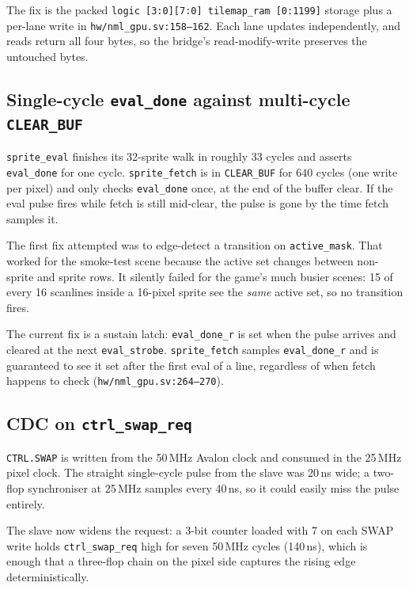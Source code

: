 \documentclass[11pt,letterpaper]{article}
\begin{document}
The fix is the packed \texttt{logic [3:0][7:0] tilemap\_ram [0:1199]}
storage plus a per-lane write in \texttt{hw/nml\_gpu.sv:158--162}. Each lane
updates independently, and reads return all four bytes, so the bridge's
read-modify-write preserves the untouched bytes.

\subsection{Single-cycle \texttt{eval\_done} against multi-cycle \texttt{CLEAR\_BUF}}

\texttt{sprite\_eval} finishes its 32-sprite walk in roughly 33 cycles and
asserts \texttt{eval\_done} for one cycle. \texttt{sprite\_fetch} is in
\texttt{CLEAR\_BUF} for 640 cycles (one write per pixel) and only checks
\texttt{eval\_done} once, at the end of the buffer clear. If the eval pulse
fires while fetch is still mid-clear, the pulse is gone by the time fetch
samples it.

The first fix attempted was to edge-detect a transition on
\texttt{active\_mask}. That worked for the smoke-test scene because the
active set changes between non-sprite and sprite rows. It silently failed
for the game's much busier scenes: 15 of every 16 scanlines inside a
16-pixel sprite see the \emph{same} active set, so no transition fires.

The current fix is a sustain latch: \texttt{eval\_done\_r} is set when the
pulse arrives and cleared at the next \texttt{eval\_strobe}.
\texttt{sprite\_fetch} samples \texttt{eval\_done\_r} and is guaranteed to
see it set after the first eval of a line, regardless of when fetch happens
to check (\texttt{hw/nml\_gpu.sv:264--270}).

\subsection{CDC on \texttt{ctrl\_swap\_req}}

\texttt{CTRL.SWAP} is written from the 50\,MHz Avalon clock and consumed in
the 25\,MHz pixel clock. The straight single-cycle pulse from the slave was
20\,ns wide; a two-flop synchroniser at 25\,MHz samples every 40\,ns, so it
could easily miss the pulse entirely.

The slave now widens the request: a 3-bit counter loaded with 7 on each
SWAP write holds \texttt{ctrl\_swap\_req} high for seven 50\,MHz cycles
(140\,ns), which is enough that a three-flop chain on the pixel side
captures the rising edge deterministically.
\end{document}
